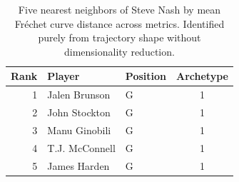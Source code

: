 \begin{table}[htbp]
  \centering\small
  \begin{tabular}{rllc}
    \toprule
    Rank & Player & Position & Archetype \\
    \midrule
    1 & Jalen Brunson & G & 1 \\
    2 & John Stockton & G & 1 \\
    3 & Manu Ginobili & G & 1 \\
    4 & T.J. McConnell & G & 1 \\
    5 & James Harden & G & 1 \\
    \bottomrule
  \end{tabular}
  \caption{Five nearest neighbors of Steve Nash by mean Fr\'{e}chet curve distance across metrics. Identified purely from trajectory shape without dimensionality reduction.}
  \label{tab:Steve_Nash_frechet_curve_neighbors}
\end{table}

